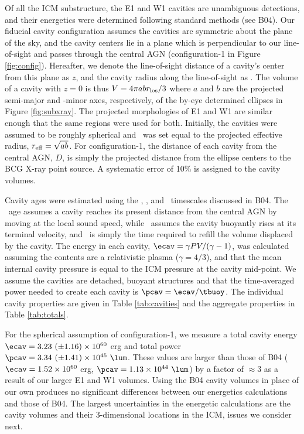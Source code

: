 \documentclass[11pt, preprint]{aastex}
\begin{document}
Of all the ICM substructure, the E1 and W1 cavities are unambiguous
detections, and their energetics were determined following standard
methods (see B04). Our fiducial cavity configuration assumes the
cavities are symmetric about the plane of the sky, and the cavity
centers lie in a plane which is perpendicular to our line-of-sight and
passes through the central AGN (configuration-1 in Figure
\ref{fig:config}). Hereafter, we denote the line-of-sight distance of
a cavity's center from this plane as $z$, and the cavity radius along
the line-of-sight as \rlos. The volume of a cavity with $z = 0$ is
thus $V = 4\pi a b r_{\rm{los}}/3$ where $a$ and $b$ are the projected
semi-major and -minor axes, respectively, of the by-eye determined
ellipses in Figure \ref{fig:subxray}. The projected morphologies of E1
and W1 are similar enough that the same regions were used for
both. Initially, the cavities were assumed to be roughly spherical and
\rlos\ was set equal to the projected effective radius, $r_{\rm{eff}} =
\sqrt{ab}$. For configuration-1, the distance of each cavity from the
central AGN, $D$, is simply the projected distance from the ellipse
centers to the BCG X-ray point source. A systematic error of 10\% is
assigned to the cavity volumes.

Cavity ages were estimated using the \tsonic, \tbuoy, and
\trefill\ timescales discussed in B04. The \tsonic\ age assumes a
cavity reaches its present distance from the central AGN by moving at
the local sound speed, while \tbuoy\ assumes the cavity buoyantly
rises at its terminal velocity, and \trefill\ is simply the time
required to refill the volume displaced by the cavity. The energy in
each cavity, $\ecav = \gamma PV/(\gamma-1)$, was calculated assuming
the contents are a relativistic plasma ($\gamma = 4/3$), and that the
mean internal cavity pressure is equal to the ICM pressure at the
cavity mid-point. We assume the cavities are detached, buoyant
structures and that the time-averaged power needed to create each
cavity is $\pcav = \ecav/\tbuoy$. The individual cavity properties are
given in Table \ref{tab:cavities} and the aggregate properties in
Table \ref{tab:totals}.

For the spherical assumption of configuration-1, we measure a total
cavity energy $\ecav = 3.23 ~(\pm 1.16) \times 10^{60}$ erg and total
power $\pcav = 3.34 ~(\pm 1.41) \times 10^{45} ~\lum$. These values
are larger than those of B04 ($\ecav = 1.52 \times 10^{60}$ erg,
$\pcav = 1.13 \times 10^{44} ~\lum$) by a factor of $\approx 3$ as a
result of our larger E1 and W1 volumes. Using the B04 cavity volumes
in place of our own produces no significant differences between our
energetics calculations and those of B04. The largest uncertainties in
the energetic calculations are the cavity volumes and their
3-dimensional locations in the ICM, issues we consider next.
\end{document}
